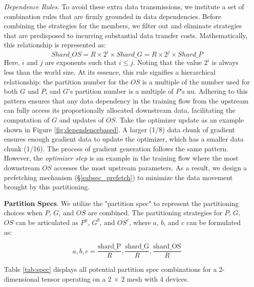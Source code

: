 \emph{Dependence Rules}. To avoid these extra data transmissions, we institute a set of combination rules that are firmly grounded in data dependencies. Before combining the strategies for the members, we filter out and eliminate strategies that are predisposed to incurring substantial data transfer costs. Mathematically, this relationship is represented as: 
\[ Shard\_{OS} = R\times2^i \times Shard\_{G} = R\times2^j \times Shard\_{P} \]
Here, \( i \) and \( j \) are exponents such that \( i \leq j \). Noting that the value \( 2^i \) is always less than the world size. At its essence, this rule signifies a hierarchical relationship: the partition number for the $OS$ is a multiple of the number used for both $G$ and $P$, and $G$'s partition number is a multiple of $P$'s nu. Adhering to this pattern ensures that any data dependency in the training flow from the upstream can fully access its proportionally allocated downstream data, facilitating the computation of $G$ and updates of $OS$. Take the optimizer update as an example shown in Figure \ref{fig:dependencebased}. A larger (1/8) data chunk of gradient ensures enough gradient data to update the optimizer, which has a smaller data chunk (1/16). The process of gradient generation follows the same pattern. However, the \emph{optimizer step} is an example in the training flow where the most downstream $OS$ accesses the most upstream parameters. As a result, we design a prefetching mechanism (\S\ref{subsec_prefetch}) to minimize the data movement brought by this partitioning.


\noindent\textbf{Partition Specs}. We utilize the "partition spec" to represent the partitioning choices when $P$, $G$, and $OS$ are combined. The partitioning strategies for $P$, $G$, $OS$ can be articulated as \( P^a \), \( G^b \), and \( OS^c \), where \(a\), \(b\), and \(c\) can be formulated as:

\vspace{-5pt}
\[a, b, c = \frac{\text{shard\_P}}{R}, \frac{\text{shard\_G}}{R}, \frac{\text{shard\_OS}}{R}\]


Table \ref{tab:spec} displays all potential partition spec combinations for a 2-dimensional tensor operating on a 2 × 2 mesh with 4 devices.\\


